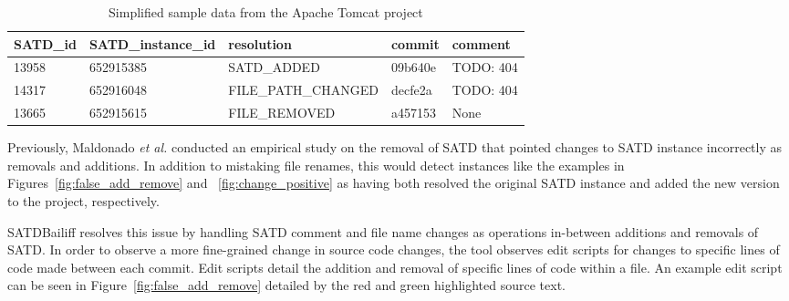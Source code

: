 \documentclass[3p]{elsarticle}
\newcommand{\approach}{SATDBailiff\xspace}
\begin{document}
\begin{table}
    \centering
    \caption{Simplified sample data from the Apache Tomcat project}
    \begin{tabular}{|p{4.5em}|p{9em}|p{12em}|p{3.6em}|p{10em}|}
     \hline
      \textbf{SATD\_id} & \textbf{SATD\_instance\_id} & \textbf{resolution} & \textbf{commit} & \textbf{comment}\\
     \hline
    13958 &  652915385 & SATD\_ADDED   & 09b640e & TODO: 404\\
     14317 &  652916048 & FILE\_PATH\_CHANGED & decfe2a & TODO: 404\\ 
     13665 &  652915615 & FILE\_REMOVED & a457153 & None\\
    
     \hline
    \end{tabular}
    
    \label{fig:sample_data}
\end{table}


\label{ref:operations}

Previously, Maldonado \textit{et al.} \cite{Maldonado2017-2} conducted an empirical study on the removal of SATD that pointed changes to SATD instance incorrectly as removals and additions. 
In addition to mistaking file renames, this would detect instances like the examples in Figures~\ref{fig:false_add_remove} and ~\ref{fig:change_positive} as having both resolved the original SATD instance and added the new version to the project, respectively.


\approach resolves this issue by handling SATD comment and file name changes as operations in-between additions and removals of SATD. In order to observe a more fine-grained change in source code changes, the tool observes edit scripts for changes to specific lines of code made between each commit. Edit scripts detail the addition and removal of specific lines of code within a file. An example edit script can be seen in Figure~\ref{fig:false_add_remove} detailed by the red and green highlighted source text.
\end{document}
